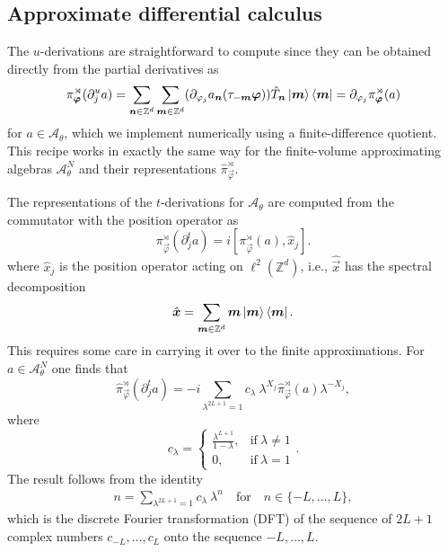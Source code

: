 \documentclass[submission, Phys]{SciPost}
\begin{document}
\subsection{Approximate differential calculus}
\label{subsec:approx_calculus}

The $u$-derivations are straightforward to compute since they can be obtained directly from the partial derivatives as
\begin{equation}
    \pi_{\boldsymbol{\varphi}}^\rtimes(\partial_j^u a) = \sum_{\boldsymbol{n}\in\mathbb{Z}^d} \sum_{\boldsymbol{m}\in\mathbb{Z}^d} (\partial_{\varphi_j} a_{\boldsymbol{n}}(\tau_{-\boldsymbol{m}} \boldsymbol{\varphi})) \hat{T}_{\boldsymbol{n}} \ket{\boldsymbol{m}}\bra{\boldsymbol{m}}  
    = \partial_{\varphi_j}  \pi_{\boldsymbol{\varphi}}^\rtimes(a)
\end{equation}
for $a \in \mathscr{A}_\theta$, which we implement numerically using a finite-difference quotient. This recipe works in exactly the same way for the finite-volume approximating algebras $\mathcal{A}_\theta^N$ and their representations $\hat{\pi}^\rtimes_{\vec{\varphi}}$.

\noindent The representations of the $t$-derivations for $\mathscr{A}_\theta$ are computed from the commutator with the position operator as 
\begin{equation}
    \pi_{\vec{\varphi}}^\rtimes(\partial_j^t a) = i[\pi^\rtimes_{\vec{\varphi}}(a),\hat{x}_j] .
\end{equation}
where  $\hat{x}_j$ is the position operator acting on $\ell^2(\mathbb{Z}^d)$, i.e., $ \hat{\vec{x}}$ has the spectral decomposition
\begin{align}
    \hat{\boldsymbol{x}} = \sum_{\boldsymbol{m}\in \mathbb{Z}^d} \boldsymbol{m} \ket{\boldsymbol{m}}\bra{\boldsymbol{m}} .
\end{align}
This requires some care in carrying it over to the finite approximations. 
For $a\in\mathcal{A}_\theta^N$ one finds \cite[Prop 4.26]{Prodan2017} that
\begin{equation}
    \hat{\pi}^\rtimes_{\vec{\varphi}}(\partial_j^t a) = -i\sum_{\lambda^{2L+1}=1} c_\lambda\ \lambda^{X_j} \hat{\pi}^\rtimes_{\vec{\varphi}}(a)\lambda^{-X_j},
\end{equation}
where
\begin{equation}
    c_\lambda = \begin{cases}
\frac{\lambda^{L+1}}{1-\lambda}, & \text{if}\ \lambda\neq 1 \\
 0, & \text{if}\ \lambda=1
\end{cases}.
\end{equation}
The result follows from the identity
\begin{align}
    n = \sum_{\lambda^{2L+1}=1} c_\lambda\ \lambda^n \quad \text{for} \quad n\in \{-L,\dots,L\} ,
\end{align}
which is the discrete Fourier transformation (DFT) of the sequence of $2L+1$ complex numbers $c_{-L},\dots,c_L$ onto the sequence $-L,\dots,L$.
\end{document}
